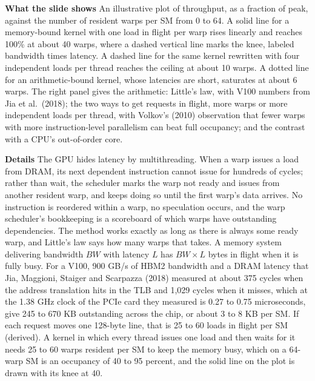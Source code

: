 \documentclass[11pt,letterpaper]{article}
\newcommand{\para}[1]{\medskip\noindent\textbf{#1}\quad}
\begin{document}
\para{What the slide shows} An illustrative plot of throughput, as a fraction of peak, against the number of resident warps per SM from 0 to 64. A solid line for a memory-bound kernel with one load in flight per warp rises linearly and reaches 100\% at about 40 warps, where a dashed vertical line marks the knee, labeled bandwidth times latency. A dashed line for the same kernel rewritten with four independent loads per thread reaches the ceiling at about 10 warps. A dotted line for an arithmetic-bound kernel, whose latencies are short, saturates at about 6 warps. The right panel gives the arithmetic: Little's law, with V100 numbers from Jia et al.\ (2018); the two ways to get requests in flight, more warps or more independent loads per thread, with Volkov's (2010) observation that fewer warps with more instruction-level parallelism can beat full occupancy; and the contrast with a CPU's out-of-order core.

\para{Details} The GPU hides latency by multithreading. When a warp issues a load from DRAM, its next dependent instruction cannot issue for hundreds of cycles; rather than wait, the scheduler marks the warp not ready and issues from another resident warp, and keeps doing so until the first warp's data arrives. No instruction is reordered within a warp, no speculation occurs, and the warp scheduler's bookkeeping is a scoreboard of which warps have outstanding dependencies. The method works exactly as long as there is always some ready warp, and Little's law says how many warps that takes. A memory system delivering bandwidth $BW$ with latency $L$ has $BW \times L$ bytes in flight when it is fully busy. For a V100, 900 GB/s of HBM2 bandwidth and a DRAM latency that Jia, Maggioni, Staiger and Scarpazza (2018) measured at about 375 cycles when the address translation hits in the TLB and 1,029 cycles when it misses, which at the 1.38 GHz clock of the PCIe card they measured is 0.27 to 0.75 microseconds, give 245 to 670 KB outstanding across the chip, or about 3 to 8 KB per SM. If each request moves one 128-byte line, that is 25 to 60 loads in flight per SM (derived). A kernel in which every thread issues one load and then waits for it needs 25 to 60 warps resident per SM to keep the memory busy, which on a 64-warp SM is an occupancy of 40 to 95 percent, and the solid line on the plot is drawn with its knee at 40.
\end{document}
